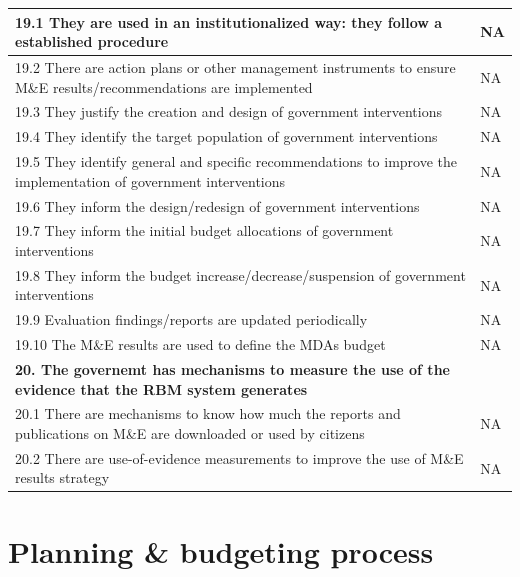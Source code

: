 \documentclass[
  10pt,
]{book}
\begin{document}
\begin{table}
\begin{tabular}[t]{l|l}
\hline
\hspace{1em}19.1 They are used in an institutionalized way: they follow a established procedure & NA\\
\hline
\hspace{1em}19.2 There are action plans or other management instruments to ensure M\&E results/recommendations are implemented & NA\\
\hline
\hspace{1em}19.3 They justify the creation and design of government interventions & NA\\
\hline
\hspace{1em}19.4 They identify the target population of government interventions & NA\\
\hline
\hspace{1em}19.5 They identify general and specific recommendations to improve the implementation of government interventions & NA\\
\hline
\hspace{1em}19.6 They inform the design/redesign of government interventions & NA\\
\hline
\hspace{1em}19.7 They inform the initial budget allocations of government interventions & NA\\
\hline
\hspace{1em}19.8 They inform the budget increase/decrease/suspension of government interventions & NA\\
\hline
\hspace{1em}19.9 Evaluation findings/reports are updated periodically & NA\\
\hline
\hspace{1em}19.10 The M\&E results are used to define the MDAs budget & NA\\
\hline
\multicolumn{2}{l}{\textbf{20. The governemt has mechanisms to measure the use of the evidence that the RBM system generates}}\\
\hline
\hspace{1em}20.1 There are mechanisms to know how much the reports and publications on M\&E are downloaded or used by citizens & NA\\
\hline
\hspace{1em}20.2 There are use-of-evidence measurements to improve the use of M\&E results strategy & NA\\
\hline
\end{tabular}
\end{table}

\hypertarget{appendixC}{%
\chapter{Planning \& budgeting process}\label{appendixC}}
\end{document}
